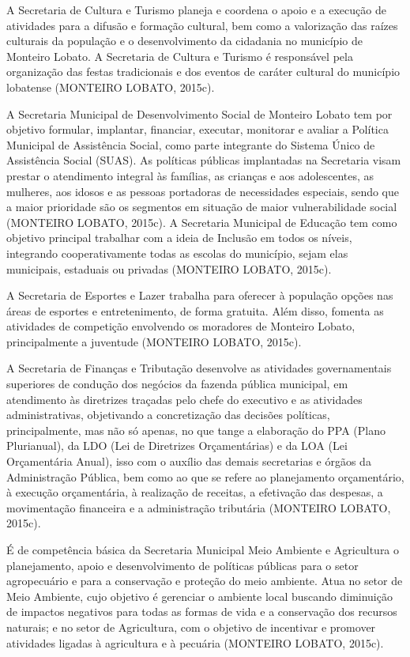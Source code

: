 A Secretaria de Cultura e Turismo planeja e coordena o apoio e a execução de atividades para a difusão e formação cultural, bem como a valorização das raízes culturais da população e o desenvolvimento da cidadania no município de Monteiro Lobato. A Secretaria de Cultura e Turismo é responsável pela organização das festas tradicionais e dos eventos de caráter cultural do município lobatense (MONTEIRO LOBATO, 2015c).

A Secretaria Municipal de Desenvolvimento Social de Monteiro Lobato tem por objetivo formular, implantar, financiar, executar, monitorar e avaliar a Política Municipal de Assistência Social, como parte integrante do Sistema Único de Assistência Social (SUAS). As políticas públicas implantadas na Secretaria visam prestar o atendimento integral às famílias, as crianças e aos adolescentes, as mulheres, aos idosos e as pessoas portadoras de necessidades especiais, sendo que a maior prioridade são os segmentos em situação de maior vulnerabilidade social (MONTEIRO LOBATO, 2015c).
A Secretaria Municipal de Educação tem como objetivo principal trabalhar com a ideia de Inclusão em todos os níveis, integrando cooperativamente todas as escolas do município, sejam elas municipais, estaduais ou privadas (MONTEIRO LOBATO, 2015c).

A Secretaria de Esportes e Lazer trabalha para oferecer à população opções nas áreas de esportes e entretenimento, de forma gratuita. Além disso, fomenta as atividades de competição envolvendo os moradores de Monteiro Lobato, principalmente a juventude (MONTEIRO LOBATO, 2015c).

A Secretaria de Finanças e Tributação desenvolve as atividades governamentais superiores de condução dos negócios da fazenda pública municipal, em atendimento às diretrizes traçadas pelo chefe do executivo e as atividades administrativas, objetivando a concretização das decisões políticas, principalmente, mas não só apenas, no que tange a elaboração do PPA (Plano Plurianual), da LDO (Lei de Diretrizes Orçamentárias) e da LOA (Lei Orçamentária Anual), isso com o auxílio das demais secretarias e órgãos da Administração Pública, bem como ao que se refere ao planejamento orçamentário, à execução orçamentária, à realização de receitas, a efetivação das despesas, a movimentação financeira e a administração tributária (MONTEIRO LOBATO, 2015c).

É de competência básica da Secretaria Municipal Meio Ambiente e Agricultura o planejamento, apoio e desenvolvimento de políticas públicas para o setor agropecuário e para a conservação e proteção do meio ambiente. Atua no setor de Meio Ambiente, cujo objetivo é gerenciar o ambiente local buscando diminuição de impactos negativos para todas as formas de vida e a conservação dos recursos naturais; e no setor de Agricultura, com o objetivo de incentivar e promover atividades ligadas à agricultura e à pecuária (MONTEIRO LOBATO, 2015c).

